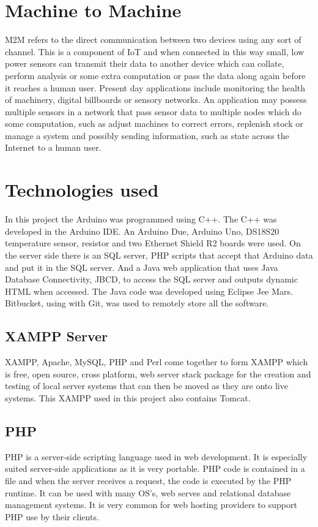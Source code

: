 \section{Machine to Machine}

M2M refers to the direct communication between two devices using any sort of channel. This is a component of IoT and when connected in this way small, low power sensors can transmit their data to another device which can collate, perform analysis or some extra computation or pass the data along again before it reaches a human user. Present day applications include monitoring the health of machinery, digital billboards or sensory networks. An application may possess multiple sensors in a network that pass sensor data to multiple nodes which do some computation, such as adjust machines to correct errors, replenish stock or manage a system and possibly sending information, such as state across the Internet to a human user.



\section{Technologies used}

In this project the Arduino was programmed using C++. The C++ was developed in the Arduino IDE. An Arduino Due, Arduino Uno, DS18S20 temperature sensor, resistor and two Ethernet Shield R2 boards were used. On the server side there is an SQL server, PHP scripts that accept that Arduino data and put it in the SQL server. And a Java web application that uses Java Database Connectivity, JBCD, to access the SQL server and outputs dynamic HTML when accessed. The Java code was developed using Eclipse Jee Mars. Bitbucket, using with Git, was used to remotely store all the software.

\subsection{XAMPP Server}

XAMPP, Apache, MySQL, PHP and Perl come together to form XAMPP which is free, open source, cross platform, web server stack package for the creation and testing of local server systems that can then be moved as they are onto live systems. This XAMPP used in this project also contains Tomcat.

\subsection{PHP}
PHP is a server-side scripting language used in web development. It is especially suited server-side applications as it is very portable. PHP code is contained in a file and when the server receives a request, the code is executed by the PHP runtime. It can be used with many OS's, web serves and relational database management systems. It is very common for web hosting providers to support PHP use by their clients.

